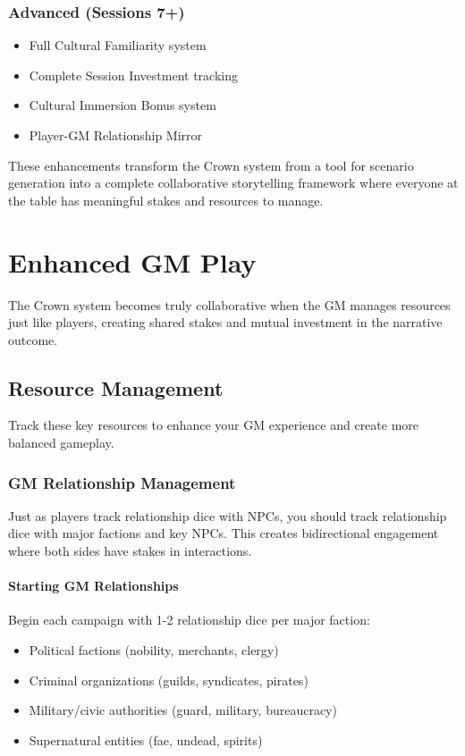 \begin{description}
\subsection{Advanced (Sessions 7+)}

\begin{itemize}
\item Full Cultural Familiarity system
\item Complete Session Investment tracking
\item Cultural Immersion Bonus system
\item Player-GM Relationship Mirror
\end{itemize}

These enhancements transform the Crown system from a tool for scenario generation into a complete collaborative storytelling framework where everyone at the table has meaningful stakes and resources to manage.

\chapter{Enhanced GM Play}

The Crown system becomes truly collaborative when the GM manages resources just like players, creating shared stakes and mutual investment in the narrative outcome.

\section{Resource Management}

Track these key resources to enhance your GM experience and create more balanced gameplay.

\subsection{GM Relationship Management}

Just as players track relationship dice with NPCs, you should track relationship dice with major factions and key NPCs. This creates bidirectional engagement where both sides have stakes in interactions.

\subsubsection{Starting GM Relationships}

Begin each campaign with 1-2 relationship dice per major faction:
\begin{itemize}
\item Political factions (nobility, merchants, clergy)
\item Criminal organizations (guilds, syndicates, pirates)
\item Military/civic authorities (guard, military, bureaucracy)
\item Supernatural entities (fae, undead, spirits)
\end{itemize}


\end{description}
